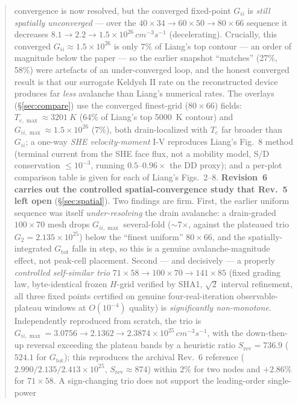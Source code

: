 \documentclass[11pt]{article}
\begin{document}
\begin{abstract}
convergence is now resolved, but the converged fixed-point $G_{ii}$ is \emph{still spatially
unconverged} --- over the $40{\times}34\!\to\!60{\times}50\!\to\!80{\times}66$ sequence it decreases
$8.1\!\to\!2.2\!\to\!1.5\times10^{26}\,\si{cm^{-3}s^{-1}}$ (decelerating). Crucially, this converged
$G_{ii}\approx1.5\times10^{26}$ is only $7\%$ of Liang's top contour --- an order of magnitude below
the paper --- so the earlier snapshot ``matches'' (27\%, 58\%) were artefacts of an under-converged
loop, and the honest converged result is that our surrogate Keldysh II rate on the reconstructed
device produces far \emph{less} avalanche than Liang's numerical rates. The overlays
(\S\ref{sec:compare}) use the converged finest-grid ($80{\times}66$) fields:
$T_{e,\max}\approx\SI{3201}{K}$ (64\% of Liang's top \SI{5000}{K} contour) and
$G_{ii,\max}\approx1.5\times10^{26}$ (7\%), both drain-localized with $T_e$ far broader than
$G_{ii}$; a one-way \emph{SHE velocity-moment} I-V reproduces Liang's Fig.~8 method (terminal current
from the SHE face flux, not a mobility model, S/D conservation $\le10^{-3}$, running
$0.5$--$0.96\times$ the DD proxy); and a per-plot comparison table is given for each of Liang's
Figs.~2--8.
\textbf{Revision~6 carries out the controlled spatial-convergence study that Rev.~5 left open}
(\S\ref{sec:spatial}). Two findings are firm. First, the earlier uniform sequence was itself
\emph{under-resolving} the drain avalanche: a drain-graded $100\times70$ mesh drops $G_{ii,\max}$
several-fold ($\sim$7$\times$, against the plateaued trio $G_2=2.135\times10^{25}$) below the ``finest
uniform'' $80\times66$, and the spatially-integrated $G_{\mathrm{tot}}$ falls in step, so this is a
genuine avalanche-magnitude effect, not peak-cell placement. Second --- and decisively --- a properly \emph{controlled self-similar trio}
$71{\times}58\to100{\times}70\to141{\times}85$ (fixed grading law, byte-identical frozen $H$-grid
verified by SHA1, $\sqrt2$ interval refinement, all three fixed points certified on genuine
four-real-iteration observable-plateau windows at $O(10^{-4})$ quality) is \emph{significantly
non-monotone}. Independently reproduced from scratch, the trio is
$G_{ii,\max}=3.0756\to2.1362\to2.3874\times10^{25}\,\si{cm^{-3}s^{-1}}$, with the down-then-up reversal
exceeding the plateau bands by a heuristic ratio $S_{\mathrm{rev}}=736.9$ ($524.1$ for
$G_{\mathrm{tot}}$); this reproduces the archival Rev.~6 reference
($2.990/2.135/2.413\times10^{25}$, $S_{\mathrm{rev}}\approx874$) within $2\%$ for two nodes and
$+2.86\%$ for $71{\times}58$. A sign-changing trio does not support the leading-order single-power

\end{abstract}
\end{document}

